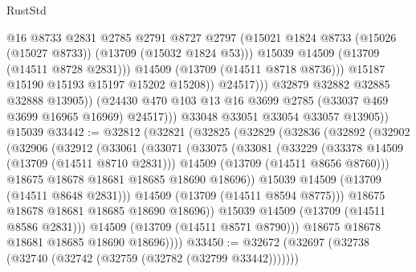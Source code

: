 \begin{lexlean}{RustStd}
\begin{coremodule}
                              @16
                              @8733
                              @2831
                              @2785
                              @2791
                              @8727
                              @2797
                              (@15021
                                @1824
                                @8733
                                (@15026 (@15027 @8733))
                                (@13709 (@15032 @1824 @53)))
                              @15039
                              @14509
                              (@13709 (@14511 @8728 @2831)))
                            @14509
                            (@13709 (@14511 @8718 @8736)))
                          @15187
                          @15190
                          @15193
                          @15197
                          @15202
                          @15208))
                      @24517)))
                @32879
                @32882
                @32885
                @32888
                @13905))
            (@24430 @470 @103 @13 @16 @3699 @2785 (@33037 @469 @3699 @16965 @16969) @24517)))
        @33048
        @33051
        @33054
        @33057
        @13905))
    @15039
@33442 := @32812
    (@32821
      (@32825
        (@32829
          (@32836
            (@32892
              (@32902
                (@32906
                  (@32912
                    (@33061
                      (@33071
                        (@33075
                          (@33081
                            (@33229
                              (@33378 @14509 (@13709 (@14511 @8710 @2831)))
                              @14509
                              (@13709 (@14511 @8656 @8760)))
                            @18675
                            @18678
                            @18681
                            @18685
                            @18690
                            @18696))
                        @15039
                        @14509
                        (@13709 (@14511 @8648 @2831)))
                      @14509
                      (@13709 (@14511 @8594 @8775)))
                    @18675
                    @18678
                    @18681
                    @18685
                    @18690
                    @18696))
                @15039
                @14509
                (@13709 (@14511 @8586 @2831)))
              @14509
              (@13709 (@14511 @8571 @8790)))
            @18675
            @18678
            @18681
            @18685
            @18690
            @18696))))
@33450 := @32672 (@32697 (@32738 (@32740 (@32742 (@32759 (@32782 (@32799 @33442)))))))

\end{coremodule}
\end{lexlean}
